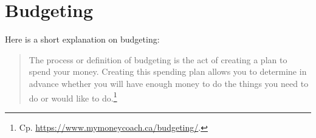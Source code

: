 \section{Budgeting}
\label{sec:budgeting}

Here is a short explanation on budgeting:
\begin{quote}\small
	The process or definition of budgeting is the act of creating a plan to spend your money.
	Creating this spending plan allows you to determine in advance whether you will have enough money to do the things you need to do or would like to do.\footnote{Cp. \url{https://www.mymoneycoach.ca/budgeting/}.}
\end{quote}







